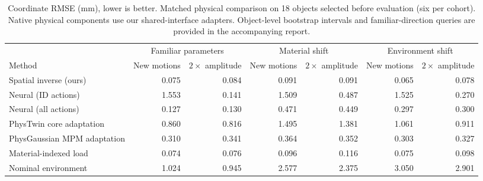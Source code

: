 \begin{table}[t]
\centering\small\setlength{\tabcolsep}{3pt}
\begin{tabular}{lrrrrrr}
\toprule
& \multicolumn{2}{c}{Familiar parameters} & \multicolumn{2}{c}{Material shift} & \multicolumn{2}{c}{Environment shift} \\
Method & New motions & $2\times$ amplitude & New motions & $2\times$ amplitude & New motions & $2\times$ amplitude \\
\midrule
Spatial inverse (ours) & 0.075 & 0.084 & 0.091 & 0.091 & 0.065 & 0.078 \\
Neural (ID actions) & 1.553 & 0.141 & 1.509 & 0.487 & 1.525 & 0.270 \\
Neural (all actions) & 0.127 & 0.130 & 0.471 & 0.449 & 0.297 & 0.300 \\
PhysTwin core adaptation & 0.860 & 0.816 & 1.495 & 1.381 & 1.061 & 0.911 \\
PhysGaussian MPM adaptation & 0.310 & 0.341 & 0.364 & 0.352 & 0.303 & 0.327 \\
Material-indexed load & 0.074 & 0.076 & 0.096 & 0.116 & 0.075 & 0.098 \\
Nominal environment & 1.024 & 0.945 & 2.577 & 2.375 & 3.050 & 2.901 \\
\bottomrule
\end{tabular}
\caption{Coordinate RMSE (mm), lower is better. Matched physical comparison on 18 objects selected before evaluation (six per cohort). Native physical components use our shared-interface adapters. Object-level bootstrap intervals and familiar-direction queries are provided in the accompanying report.}
\label{tab:matched}
\end{table}
